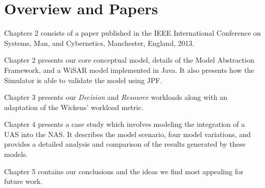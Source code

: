 \section{Overview and Papers}

Chapters 2 consists of a paper published in the IEEE International Conference on Systems, Man, and Cybernetics, Manchester, England, 2013.

Chapter 2 presents our core conceptual model, details of the Model Abstraction Framework, and a WiSAR model implemented in Java.  It also presents how the Simulator is able to validate the model using JPF.

\begin{comment}
Chapter 3 presents an extension of our conceptual model in the form of the DiTG.  It also presents a formal taxonomy of workload metrics and how that taxonomy applies to our conceptual model.  Lastly it reports the results of adding the workload metrics into the simulation framework.  Much of the work performed for this paper was completed by others; it has been added to this thesis for completeness.


Chapter 4 presents an XML Model Extension for the Model Abstraction Framework which makes it easier for the modeler to create a labeled state transition system and reduces the likelihood of coding errors in the resulting Java implementation of that system.
\end{comment}

Chapter 3 presents our {\em Decision} and {\em Resource} workloads along with an adaptation of the Wickens' workload metric.

Chapter 4 presents a case study which involves modeling the integration of a UAS into the NAS.  It describes the model scenario, four model variations, and provides a detailed analysis and comparison of the results generated by these models.

Chapter 5 contains our conclusions and the ideas we find most appealing for future work.

\begin{comment}
The appendices include the initial WiSAR proposal, the core modeling framework classes, an XML model, and simulation logs.
\end{comment}